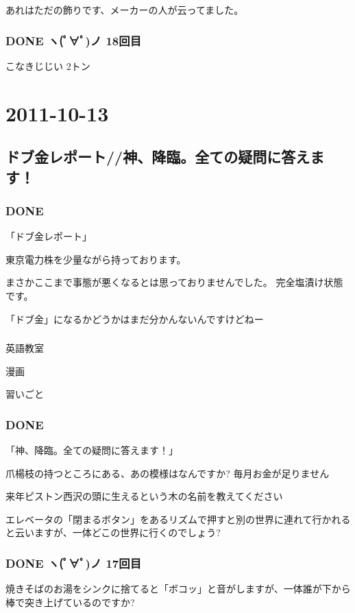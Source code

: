 \documentclass[11pt]{article}
\begin{document}
あれはただの飾りです、メーカーの人が云ってました。
\subsubsection{\textbf{DONE} ヽ(ﾟ∀ﾟ)ノ 18回目}
\label{sec-56_1_3}

こなきじじい 2トン
\section{2011-10-13}
\label{sec-57}
\subsection{ドブ金レポート//神、降臨。全ての疑問に答えます！}
\label{sec-57_1}
\subsubsection{\textbf{DONE}}
\label{sec-57_1_1}

「ドブ金レポート」

東京電力株を少量ながら持っております。

まさかここまで事態が悪くなるとは思っておりませんでした。
完全塩漬け状態です。

「ドブ金」になるかどうかはまだ分かんないんですけどねー
\subsubsection{}

英語教室

漫画

習いごと
\subsubsection{\textbf{DONE}}
\label{sec-57_1_3}

「神、降臨。全ての疑問に答えます！」

爪楊枝の持つところにある、あの模様はなんですか?
毎月お金が足りません


来年ピストン西沢の頭に生えるという木の名前を教えてください

エレベータの「閉まるボタン」をあるリズムで押すと別の世界に連れて行かれると云いますが、一体どこの世界に行くのでしょう?
\subsubsection{\textbf{DONE} ヽ(ﾟ∀ﾟ)ノ 17回目}
\label{sec-57_1_4}

焼きそばのお湯をシンクに捨てると「ボコッ」と音がしますが、一体誰が下から棒で突き上げているのですか?
\end{document}

